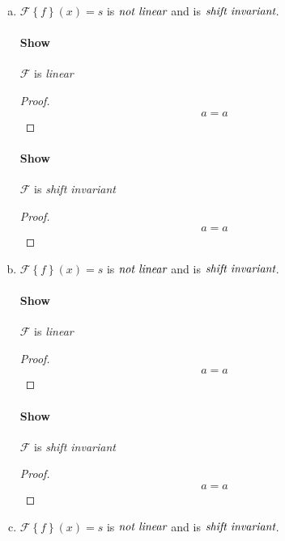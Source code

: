 \documentclass{paper}
\begin{document}
\begin{enumerate}[(a)]
\item $\mathcal{F} \left \{ f \right\} (x) = s$ is $\emph{not linear}$ and is $\emph{shift invariant}$.

\paragraph{Show} $\mathcal{F}$ is \emph{linear} \\
\begin{proof}
\begin{align*}
    a = a
\end{align*}
\end{proof}

\paragraph{Show} $\mathcal{F}$ is \emph{shift invariant} \\
\begin{proof}
\begin{align*}
    a = a
\end{align*}
\end{proof}


\item $\mathcal{F} \left \{ f \right\} (x) = s$ is $\emph{not linear}$ and is $\emph{shift invariant}$.

\paragraph{Show} $\mathcal{F}$ is \emph{linear} \\
\begin{proof}
\begin{align*}
    a = a
\end{align*}
\end{proof}

\paragraph{Show} $\mathcal{F}$ is \emph{shift invariant} \\
\begin{proof}
\begin{align*}
    a = a
\end{align*}
\end{proof}

\item $\mathcal{F} \left \{ f \right\} (x) = s$ is $\emph{not linear}$ and is $\emph{shift invariant}$.


\end{enumerate}
\end{document}
